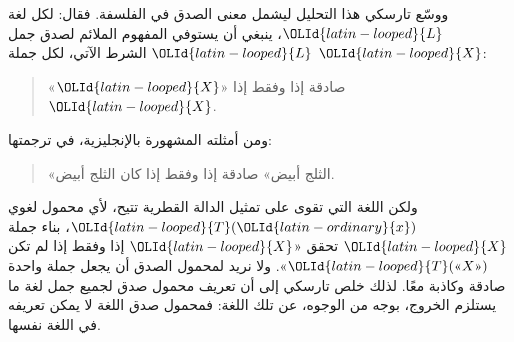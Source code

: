 \documentclass[../../../include/open-logic-section]{subfiles}
\begin{document}
ووسّع تارسكي هذا التحليل ليشمل معنى الصدق في الفلسفة.
فقال: لكل لغة $\OLId{latin-looped}{L}$، ينبغي أن يستوفي المفهوم الملائم لصدق جمل
$\OLId{latin-looped}{L}$ الشرط الآتي، لكل جملة $\OLId{latin-looped}{X}$:
\begin{quote}
«$\OLId{latin-looped}{X}$» صادقة إذا وفقط إذا $\OLId{latin-looped}{X}$.
\end{quote}
ومن أمثلته المشهورة بالإنجليزية، في ترجمتها:
\begin{quote}
«الثلج أبيض» صادقة إذا وفقط إذا كان الثلج أبيض.
\end{quote}
ولكن اللغة التي تقوى على تمثيل الدالة القطرية تتيح، لأي محمول
لغوي $\OLId{latin-looped}{T}(\OLId{latin-ordinary}{x})$، بناء جملة $\OLId{latin-looped}{X}$ تحقق «$\OLId{latin-looped}{X}$ إذا وفقط إذا لم تكن
$\OLId{latin-looped}{T}(\text{«$X$»})$». ولا نريد لمحمول الصدق أن يجعل جملة واحدة
صادقة وكاذبة معًا. لذلك خلص تارسكي إلى أن تعريف محمول صدق
لجميع جمل لغة ما يستلزم الخروج، بوجه من الوجوه، عن تلك اللغة:
فمحمول صدق اللغة لا يمكن تعريفه في اللغة نفسها.
\end{document}
